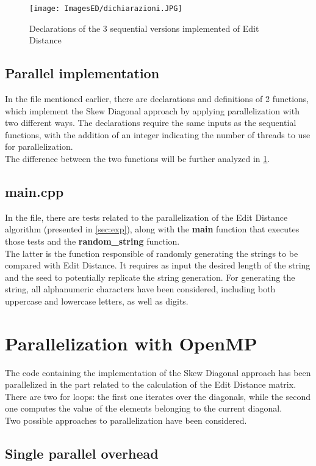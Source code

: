 \documentclass[10pt,twocolumn,letterpaper]{article}
\begin{document}
\begin{figure}[h]
    \centering
    \texttt{[image: ImagesED/dichiarazioni.JPG]}
    \caption{Declarations of the 3 sequential versions implemented of Edit Distance}
    \label{fig:dcl}
\end{figure}

\subsection{Parallel implementation}
In the file mentioned earlier, there are declarations and definitions of 2 functions, which implement the Skew Diagonal approach by applying parallelization with two different ways. The declarations require the same inputs as the sequential functions, with the addition of an integer indicating the number of threads to use for parallelization.\\
The difference between the two functions will be further analyzed in \cref{sec:par}.

\subsection{main.cpp}
In the file, there are tests related to the parallelization of the Edit Distance algorithm (presented in \cref{sec:exp}), along with the \textbf{main} function that executes those tests and the \textbf{random\_string} function.\\
The latter is the function responsible of randomly generating the strings to be compared with Edit Distance. It requires as input the desired length of the string and the seed to potentially replicate the string generation. For generating the string, all alphanumeric characters have been considered, including both uppercase and lowercase letters, as well as digits.

\section{Parallelization with OpenMP}
\label{sec:par}
The code containing the implementation of the Skew Diagonal approach has been parallelized in the part related to the calculation of the Edit Distance matrix. There are two for loops: the first one iterates over the diagonals, while the second one computes the value of the elements belonging to the current diagonal.\\
Two possible approaches to parallelization have been considered.

\subsection{Single parallel overhead}
\end{document}
